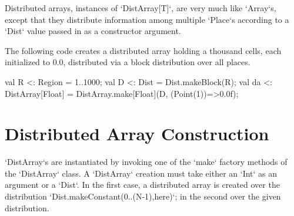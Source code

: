 Distributed arrays, instances of \xcd`DistArray[T]`, are very much like
\xcd`Array`s, except that they distribute information among multiple
\xcd`Place`s according to a \xcd`Dist` value passed in as a constructor
argument.  

\begin{ex}The following code creates a distributed array holding
a thousand cells, each initialized to 0.0, distributed via a block
distribution over all places.
\begin{xten}
val R <: Region = 1..1000;
val D <: Dist = Dist.makeBlock(R);
val da <: DistArray[Float] 
       = DistArray.make[Float](D, (Point(1))=>0.0f);
\end{xten}
\end{ex}



\section{Distributed Array Construction}\label{ArrayInitializer}

\xcd`DistArray`s are instantiated by invoking one of the \xcd`make` factory
methods of the \xcd`DistArray` class.
A \xcd`DistArray` creation 
must take either an \xcd`Int` as an argument or a \xcd`Dist`. In the first
case,  a distributed array is created over the distribution 
\xcd`Dist.makeConstant(0..(N-1),here)`;
in the second over the given distribution. 

